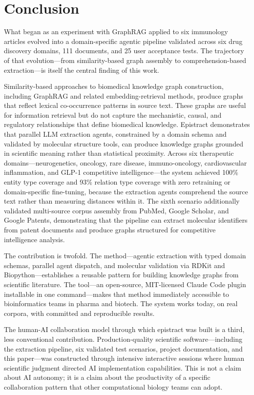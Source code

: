 \section{Conclusion}

What began as an experiment with GraphRAG applied to six immunology articles evolved into a domain-specific agentic pipeline validated across six drug discovery domains, 111 documents, and 25 user acceptance tests. The trajectory of that evolution---from similarity-based graph assembly to comprehension-based extraction---is itself the central finding of this work.

Similarity-based approaches to biomedical knowledge graph construction, including GraphRAG and related embedding-retrieval methods, produce graphs that reflect lexical co-occurrence patterns in source text. These graphs are useful for information retrieval but do not capture the mechanistic, causal, and regulatory relationships that define biomedical knowledge. Epistract demonstrates that parallel LLM extraction agents, constrained by a domain schema and validated by molecular structure tools, can produce knowledge graphs grounded in scientific meaning rather than statistical proximity. Across six therapeutic domains---neurogenetics, oncology, rare disease, immuno-oncology, cardiovascular inflammation, and GLP-1 competitive intelligence---the system achieved 100\% entity type coverage and 93\% relation type coverage with zero retraining or domain-specific fine-tuning, because the extraction agents comprehend the source text rather than measuring distances within it. The sixth scenario additionally validated multi-source corpus assembly from PubMed, Google Scholar, and Google Patents, demonstrating that the pipeline can extract molecular identifiers from patent documents and produce graphs structured for competitive intelligence analysis.

The contribution is twofold. The method---agentic extraction with typed domain schemas, parallel agent dispatch, and molecular validation via RDKit and Biopython---establishes a reusable pattern for building knowledge graphs from scientific literature. The tool---an open-source, MIT-licensed Claude Code plugin installable in one command---makes that method immediately accessible to bioinformatics teams in pharma and biotech. The system works today, on real corpora, with committed and reproducible results.

The human-AI collaboration model through which epistract was built is a third, less conventional contribution. Production-quality scientific software---including the extraction pipeline, six validated test scenarios, project documentation, and this paper---was constructed through intensive interactive sessions where human scientific judgment directed AI implementation capabilities. This is not a claim about AI autonomy; it is a claim about the productivity of a specific collaboration pattern that other computational biology teams can adopt.

